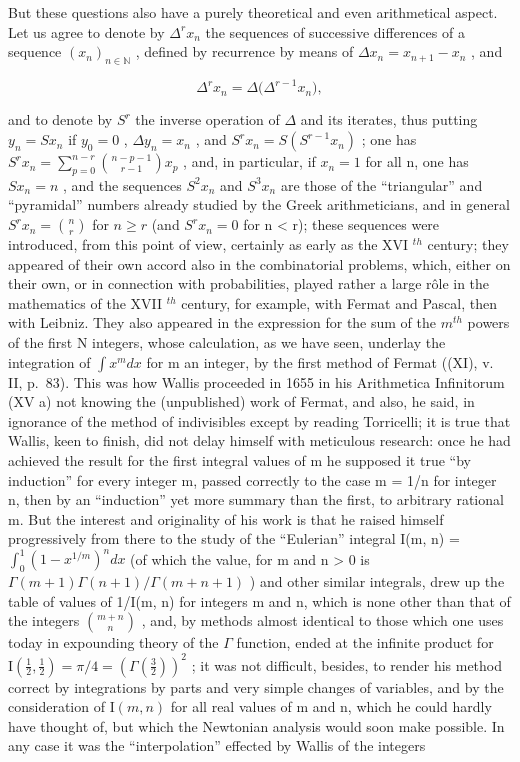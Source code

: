 But these questions also have a purely theoretical and even arithmetical aspect. Let us agree to denote by \(\Delta^{r}x_{n}\) the sequences of successive differences of a sequence \((x_{n})_{n\in\mathbb{N}}\) , defined by recurrence by means of \(\Delta x_{n}=x_{n+1}-x_{n}\) , and

\[
\varDelta^ {r} x _ {n} = \varDelta \big (\varDelta^ {r - 1} x _ {n} \big),
\]

and to denote by \(S^{r}\) the inverse operation of \(\Delta\) and its iterates, thus putting \(y_{n} = Sx_{n}\) if \(y_{0} = 0\) , \(\Delta y_{n} = x_{n}\) , and \(S^{r}x_{n} = S\left(S^{r-1}x_{n}\right)\) ; one has \(S^{r}x_{n} = \sum_{p=0}^{n-r} \binom{n-p-1}{r-1} x_{p}\) , and, in particular, if \(x_{n} = 1\) for all n, one has \(Sx_{n} = n\) , and the sequences \(S^{2}x_{n}\) and \(S^{3}x_{n}\) are those of the ``triangular'' and ``pyramidal'' numbers already studied by the Greek arithmeticians, and in general \(S^{r}x_{n} = \binom{n}{r}\) for \(n \geqslant r\) (and \(S^{r}x_{n} = 0\) for n \textless{} r); these sequences were introduced, from this point of view, certainly as early as the XVI \(^{th}\) century; they appeared of their own accord also in the combinatorial problems, which, either on their own, or in connection with probabilities, played rather a large rôle in the mathematics of the XVII \(^{th}\) century, for example, with Fermat and Pascal, then with Leibniz. They also appeared in the expression for the sum of the \(m^{th}\) powers of the first N integers, whose calculation, as we have seen, underlay the integration of \(\int x^{m} dx\) for m an integer, by the first method of Fermat ((XI), v. II, p.~83). This was how Wallis proceeded in 1655 in his Arithmetica Infinitorum (XV a) not knowing the (unpublished) work of Fermat, and also, he said, in ignorance of the method of indivisibles except by reading Torricelli; it is true that Wallis, keen to finish, did not delay himself with meticulous research: once he had achieved the result for the first integral values of m he supposed it true ``by induction'' for every integer m, passed correctly to the case m = 1/n for integer n, then by an ``induction'' yet more summary than the first, to arbitrary rational m. But the interest and originality of his work is that he raised himself progressively from there to the study of the ``Eulerian'' integral I(m, n) = \(\int_{0}^{1}(1 - x^{1/m})^{n} dx\) (of which the value, for m and n \textgreater{} 0 is \(\Gamma(m+1)\Gamma(n+1)/\Gamma(m+n+1)\) ) and other similar integrals, drew up the table of values of 1/I(m, n) for integers m and n, which is none other than that of the integers \(\binom{m+n}{n}\) , and, by methods almost identical to those which one uses today in expounding theory of the \(\varGamma\) function, ended at the infinite product for \(\mathrm{I}(\frac{1}{2},\frac{1}{2})=\pi/4=\left(\varGamma(\frac{3}{2})\right)^{2}\) ; it was not difficult, besides, to render his method correct by integrations by parts and very simple changes of variables, and by the consideration of \(\mathrm{I}(m,n)\) for all real values of m and n, which he could hardly have thought of, but which the Newtonian analysis would soon make possible. In any case it was the ``interpolation'' effected by Wallis of the integers

